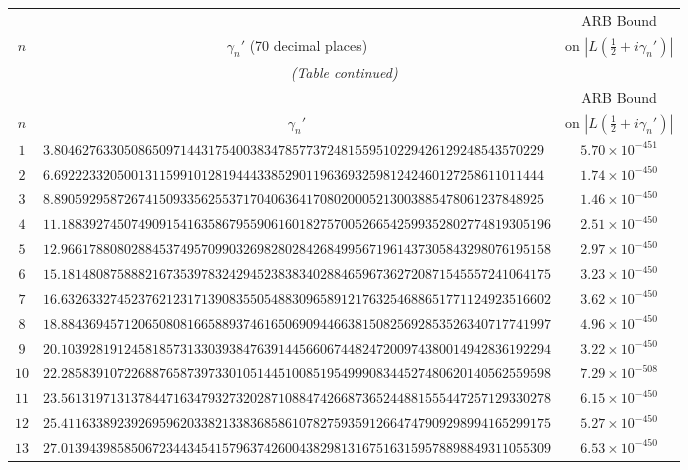 \documentclass[12pt,reqno]{amsart}
\theoremstyle{remark}
\begin{document}
\renewcommand{\arraystretch}{1.1}
\setlength{\LTleft}{\fill}
\setlength{\LTright}{\fill}
\footnotesize
\begin{longtable}{clc}
\toprule
 & & ARB Bound \\
$n$ & \multicolumn{1}{c}{$\gamma_n'$ (70 decimal places)} & on $|L(\tfrac{1}{2}+i\gamma_n')|$ \\
\midrule
\endfirsthead
\multicolumn{3}{c}{\small\itshape (Table continued)} \\
\toprule
 & & ARB Bound \\
$n$ & \multicolumn{1}{c}{$\gamma_n'$} & on $|L(\tfrac{1}{2}+i\gamma_n')|$ \\
\midrule
\endhead
\bottomrule
\endlastfoot
$1$ & $3.8046276330508650971443175400383478577372481559510229426129248543570229$ & $5.70\times 10^{-451}$ \\
$2$ & $6.6922233205001311599101281944433852901196369325981242460127258611011444$ & $1.74\times 10^{-450}$ \\
$3$ & $8.8905929587267415093356255371704063641708020005213003885478061237848925$ & $1.46\times 10^{-450}$ \\
$4$ & $11.1883927450749091541635867955906160182757005266542599352802774819305196$ & $2.51\times 10^{-450}$ \\
$5$ & $12.9661788080288453749570990326982802842684995671961437305843298076195158$ & $2.97\times 10^{-450}$ \\
$6$ & $15.1814808758882167353978324294523838340288465967362720871545557241064175$ & $3.23\times 10^{-450}$ \\
$7$ & $16.6326332745237621231713908355054883096589121763254688651771124923516602$ & $3.62\times 10^{-450}$ \\
$8$ & $18.8843694571206508081665889374616506909446638150825692853526340717741997$ & $4.96\times 10^{-450}$ \\
$9$ & $20.1039281912458185731330393847639144566067448247200974380014942836192294$ & $3.22\times 10^{-450}$ \\
$10$ & $22.2858391072268876587397330105144510085195499908344527480620140562559598$ & $7.29\times 10^{-508}$ \\
$11$ & $23.5613197131378447163479327320287108847426687365244881555447257129330278$ & $6.15\times 10^{-450}$ \\
$12$ & $25.4116338923926959620338213383685861078275935912664747909298994165299175$ & $5.27\times 10^{-450}$ \\
$13$ & $27.0139439858506723443454157963742600438298131675163159578898849311055309$ & $6.53\times 10^{-450}$ \\

\end{longtable}
\end{document}
